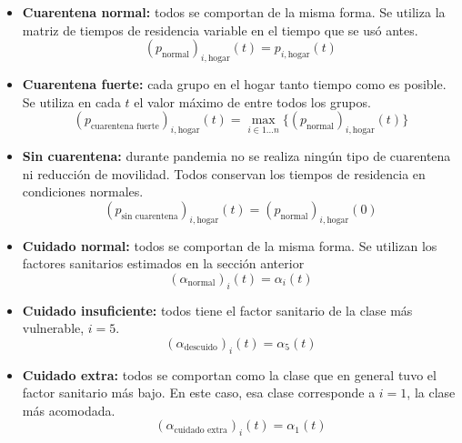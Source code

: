 \begin{itemize}
\item \textbf{Cuarentena normal:} todos se comportan de la misma forma. Se utiliza la matriz de tiempos de residencia variable en el tiempo que se usó antes.
\[(p_{\text{normal}})_{i, \text{hogar}}(t) =  p_{i, \text{hogar}}(t)\]
\item \textbf{Cuarentena fuerte:} cada grupo en el hogar tanto tiempo como es posible. Se utiliza en cada \(t\) el valor máximo de entre todos los grupos.
\[(p_{\text{cuarentena fuerte}})_{i, \text{hogar}}(t) = \max_{i \in 1\dots n} \big\{ (p_{\text{normal}})_{i, \text{hogar}}(t) \big\}\]
\item \textbf{Sin cuarentena:} durante pandemia no se realiza ningún tipo de cuarentena ni reducción de movilidad. Todos conservan los tiempos de residencia en condiciones normales.\[(p_{\text{sin cuarentena}})_{i, \text{hogar}}(t) =  (p_{\text{normal}})_{i, \text{hogar}}(0) \]
\end{itemize}

\begin{itemize}
    \item \textbf{Cuidado normal:} todos se comportan de la misma forma. Se utilizan los factores sanitarios estimados en la sección anterior
    \[ (\alpha_{\text{normal}})_{i}(t) = \alpha_i(t)\]
    \item \textbf{Cuidado insuficiente:} todos tiene el factor sanitario de la clase más vulnerable, \(i = 5\).
    \[ (\alpha_{\text{descuido}})_{i}(t) = \alpha_5(t)\]
    \item \textbf{Cuidado extra:} todos se comportan como la clase que en general tuvo el factor sanitario más bajo. En este caso, esa clase corresponde a \(i = 1\), la clase más acomodada. 
    \[ (\alpha_{\text{cuidado extra}})_{i}(t) = \alpha_1(t)\]
\end{itemize}
